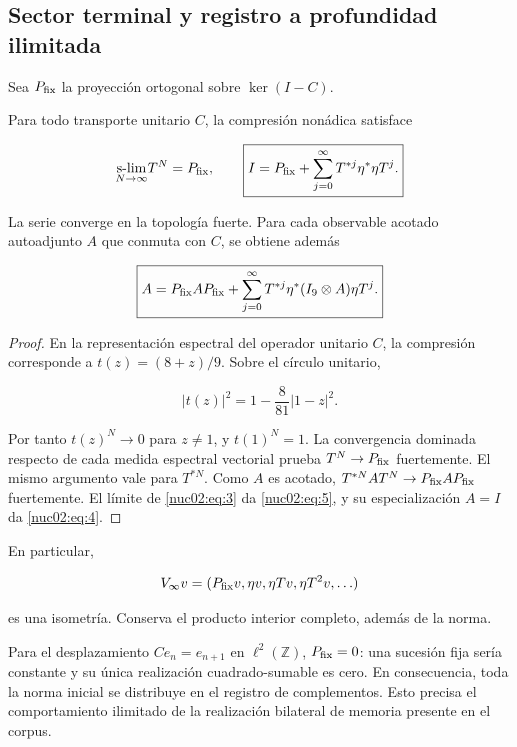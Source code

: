 \subsection{Sector terminal y registro a profundidad ilimitada}

Sea \(P_{\rm fix}\) la proyección ortogonal sobre \(\ker(I-C)\).

\begin{theorem}
Para todo transporte unitario \(C\), la compresión nonádica satisface

\begin{equation}
\underset{N\to\infty}{\operatorname{s-lim}}T^N=P_{\rm fix},\qquad
\boxed{I=P_{\rm fix}+\sum_{j=0}^{\infty}T^{*j}\eta^*\eta T^j.}\label{nuc02:eq:4}
\end{equation}

La serie converge en la topología fuerte. Para cada observable acotado autoadjunto \(A\) que conmuta con \(C\), se obtiene además

\begin{equation}
\boxed{A=P_{\rm fix}AP_{\rm fix}
+\sum_{j=0}^{\infty}T^{*j}\eta^*(I_9\otimes A)\eta T^j.}\label{nuc02:eq:5}
\end{equation}
\end{theorem}

\begin{proof}
En la representación espectral del operador unitario \(C\), la compresión corresponde a \(t(z)=(8+z)/9\). Sobre el círculo unitario,

\[
|t(z)|^2=1-\frac8{81}|1-z|^2.
\]

Por tanto \(t(z)^N\to0\) para \(z\ne1\), y \(t(1)^N=1\). La convergencia dominada respecto de cada medida espectral vectorial prueba \(T^N\to P_{\rm fix}\) fuertemente. El mismo argumento vale para \(T^{*N}\). Como \(A\) es acotado, \(T^{*N}AT^N\to P_{\rm fix}AP_{\rm fix}\) fuertemente. El límite de \eqref{nuc02:eq:3} da \eqref{nuc02:eq:5}, y su especialización \(A=I\) da \eqref{nuc02:eq:4}.
\end{proof}

En particular,

\[
V_\infty v=(P_{\rm fix}v,\eta v,\eta Tv,\eta T^2v,\ldots)
\]

es una isometría. Conserva el producto interior completo, además de la norma.

\begin{corollary}
Para el desplazamiento \(Ce_n=e_{n+1}\) en \(\ell^2(\mathbb Z)\), \(P_{\rm fix}=0\): una sucesión fija sería constante y su única realización cuadrado-sumable es cero. En consecuencia, toda la norma inicial se distribuye en el registro de complementos. Esto precisa el comportamiento ilimitado de la realización bilateral de memoria presente en el corpus.
\end{corollary}

